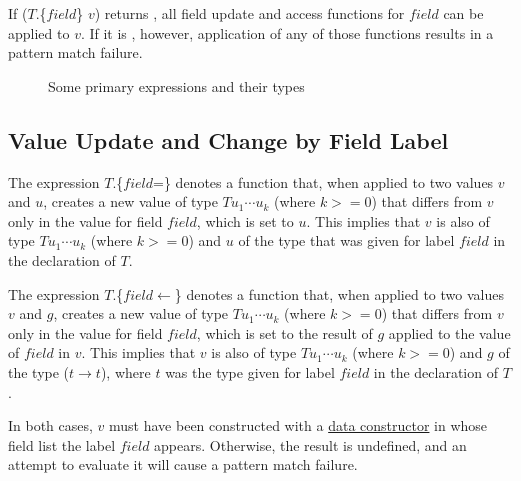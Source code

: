 If ($T$.\{$field$\} $v$) returns , all field update and access functions for $field$ can be applied to $v$. If it is , however, application of any of those functions results in a pattern match failure.

\begin{figure}[hbt]
\caption{Some primary expressions and their types}
\label{primexprexample}
\end{figure}


\subsection{Value Update and Change by Field Label} \label{fiieldupd}

The expression $T$.\{$field$=\} denotes a function that, when applied to two values $v$ and $u$, creates a new value of type $T u_1 \cdots u_k$  (where $k>=0$) that differs from $v$ only in the value for field $field$, which is set to $u$.
This implies that $v$ is also of type $T u_1 \cdots u_k$  (where $k>=0$) and $u$ of the type that was given for label $field$ in the declaration of $T$.

The expression $T$.\{$field$$\leftarrow$\} denotes a function that, when applied to two values $v$ and $g$, creates a new value of type $T u_1 \cdots u_k$  (where $k>=0$) that differs from $v$ only in the value for field $field$, which is set to the result of $g$ applied to the value of $field$ in $v$.
This implies that $v$ is also of type $T u_1 \cdots u_k$  (where $k>=0$) and $g$ of the type ($t \rightarrow t$), where $t$  was the type given for label $field$ in the declaration of $T$.

In both cases, $v$ must have been constructed with a \hyperref[fieldconstructor]{data constructor} in whose field list  the label $field$ appears. Otherwise, the result is undefined, and an attempt to evaluate it will cause a pattern match failure.

